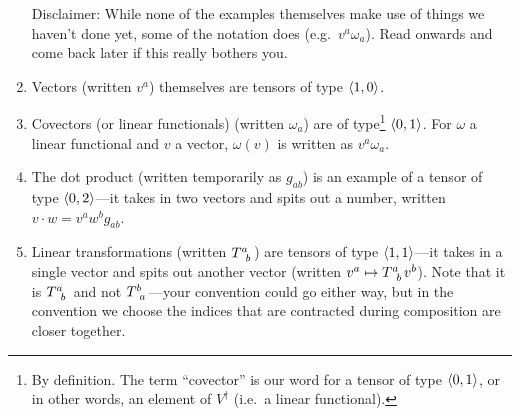 \begin{exm}
\begin{enumerate}
Disclaimer:  While none of the examples themselves make use of things we haven't done yet, some of the notation does (e.g.~$v^a\omega _a$).  Read onwards and come back later if this really bothers you.
\item Vectors (written $v^a$) themselves are tensors of type $\langle1,0\rangle$.
\item Covectors (or linear functionals) (written $\omega _a$) are of type\footnote{By definition.  The term ``covector'' is our word for a tensor of type $\langle0,1\rangle$, or in other words, an element of $V^{\dagger}$ (i.e.~a linear functional).} $\langle0,1\rangle$.  For $\omega$ a linear functional and $v$ a vector, $\omega (v)$ is written as $v^a\omega _a$.
\item The dot product (written temporarily as $g_{ab}$) is an example of a tensor of type $\langle0,2\rangle$---it takes in two vectors and spits out a number, written $v\cdot w=v^aw^bg_{ab}$.
\item Linear transformations (written $T\indices{^a_b}$) are tensors of type $\langle1,1\rangle$---it takes in a single vector and spits out another vector (written $v^a\mapsto T\indices{^a_b}v^b$).  Note that it is $T\indices{^a_b}$ and not $T\indices{^b_a}$---your convention could go either way, but in the convention we choose the indices that are contracted during composition are closer together.
\end{enumerate}
\end{exm}

